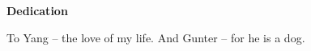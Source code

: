 \begin{center}
  \textbf{Dedication}
\end{center}

\begin{center}
  To Yang -- the love of my life.
  And Gunter -- for he is a dog.
\end{center}

\cleardoublepage
